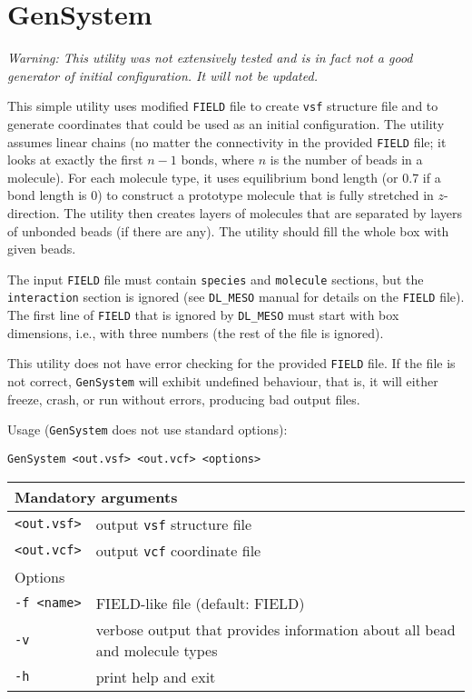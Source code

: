 \section{GenSystem} \label{sec:GenSystem}

\textit{Warning: This utility was not extensively tested and is in fact not
a good generator of initial configuration. It will not be updated.}

This simple utility uses modified \texttt{FIELD} file to create
\texttt{vsf} structure file and to generate coordinates that could be used
as an initial configuration. The utility assumes linear chains (no matter
the connectivity in the provided \texttt{FIELD} file; it looks at exactly
the first $n-1$ bonds, where $n$ is the number of beads in a molecule). For
each molecule type, it uses equilibrium bond length (or 0.7 if a bond
length is 0) to construct a prototype molecule that is fully stretched in
$z$-direction.  The utility then creates layers of molecules that are
separated by layers of unbonded beads (if there are any). The utility
should fill the whole box with given beads.

The input \texttt{FIELD} file must contain \texttt{species} and
\texttt{molecule} sections, but the \texttt{interaction} section is ignored
(see \texttt{DL\_MESO} manual for details on the \texttt{FIELD} file). The
first line of \texttt{FIELD} that is ignored by \texttt{DL\_MESO} must
start with box dimensions, i.e., with three numbers (the rest of the file
is ignored).

This utility does not have error checking for the provided \texttt{FIELD}
file. If the file is not correct, \texttt{GenSystem} will exhibit
undefined behaviour, that is, it will either freeze, crash, or run without
errors, producing bad output files.

Usage (\texttt{GenSystem} does not use standard options):

\vspace{1em}
\noindent
\texttt{GenSystem <out.vsf> <out.vcf> <options>}

\noindent
\begin{longtable}{p{}p{}}
  \toprule
  \multicolumn{2}{l}{Mandatory arguments} \\
  \midrule
  \texttt{<out.vsf>} & output \texttt{vsf} structure file \\
  \texttt{<out.vcf>} & output \texttt{vcf} coordinate file \\
  \toprule
  \multicolumn{2}{l}{Options} \\
  \midrule
  \texttt{-f <name>} & FIELD-like file (default: FIELD)\\
  \texttt{-v}        & verbose output that provides information about all
    bead and molecule types \\
  \texttt{-h}        & print help and exit \\
  \bottomrule
\end{longtable}
